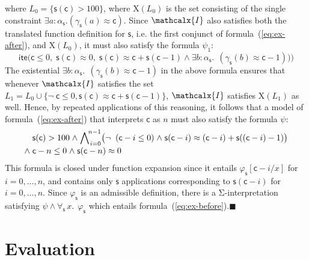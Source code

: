 \documentclass[runningheads,a4paper]{llncs}
\newcommand{\con}[1]{\mathsf{#1}}
\let\oldcup=\cup
\def\cup{\mathrel{\oldcup}}
\let\oldSigma=\Sigma
\def\Sigma{\mathrm{\oldSigma}}
\let\oldneg=\neg
\def\neg{\oldneg\;}
\let\oldwedge=\wedge
\def\wedge{\mathrel{\oldwedge}}
\newcommand{\teq}{\approx}
\newcommand{\I}{\mathcalx{I}}
\newcommand{\lite}{\con{ite}}
\newcommand\concret{\gamma} %
\newcommand{\forallf}[1]{\forall_{\!#1\:}}
\newcommand{\farg}[1]{\concret_{#1}}
\newcommand{\fargtype}[1]{\alpha_{#1}}
\newcommand{\vthinspace}{\kern+0.083333em}
\newcommand{\absconstraints}{\mathrm{X}}
\newcommand\xend{{\hfill$\scriptstyle\blacksquare$}}
\begin{document}
\begin{example}
where $L_0 = \{ \con{s}( \con{c} ) > 100 \}$, 
where $\absconstraints( L_0 )$ is the set consisting of the single constraint $\exists a : {\fargtype{\con{s}}}. (\farg{\con{s}}( a ) \teq \con{c})$.
Since $\I$ also satisfies both the translated function definition for $\con{s}$, i.e. the first conjunct of formula~(\ref{eq:ex-after}),
and $\absconstraints( L_0 )$, it must also satisfy the formula $\psi_1$:
\[
\lite\bigl( \con{c} \leq 0,\; 
            \con{s}(\con{c}) \teq 0,\;
            \con{s}(\con{c}) \teq \con{c} + \con{s}( \con{c}-1 )
            \wedge \exists b : {\fargtype{\con{s}}}.\;\, (\farg{\con{s}}( b ) \teq \con{c}-1) \bigr) \bigr)
\]
The existential $\exists b : {\fargtype{\con{s}}}.\;\, (\farg{\con{s}}( b ) \teq \con{c}-1)$ in the above formula
ensures that whenever $\I$ satisfies the set $L_1 = L_0 \cup \{ \neg \con{c} \leq 0, \con{s}(\con{c}) \teq \con{c} + \con{s}( \con{c}-1 ) \}$,
$\I$ satisfies $\absconstraints( L_1 )$ as well.
Hence, by repeated applications of this reasoning, it follows that
a model of formula~(\ref{eq:ex-after}) that interprets $\con{c}$ as $n$ must also satisfy the formula $\psi$:
%
\begin{equation} \label{eq:fun-closure}
\begin{split}
& \con{s}( \con{c} ) > 100 \wedge %
  \bigwedge\nolimits_{\vthinspace i=0}^{\!n-1} \bigl( \neg (\con{c}-i \leq 0) \wedge \con{s}( \con{c}-i ) \teq (\con{c}-i) + \con{s}( (\con{c}-i)-1 ) \bigr) \\[-\jot]
{\wedge}\; & \con{c}-n \leq 0 \wedge \con{s}( \con{c}-n ) \teq 0
\end{split}
\end{equation}
%
This formula is closed under function expansion
since it entails $\varphi_\con{s}[\con{c}-i/x]$ for $i = 0, \ldots, n$,
and contains only $\con{s}$ applications corresponding to $\con{s}( \con{c}-i )$ for $i = 0, \ldots, n$.
Since $\varphi_\con{s}$ is an admissible definition,
there is a $\Sigma$-interpretation satisfying $\psi \wedge \forallf{\con{s}} x.\;\, \varphi_\con{s}$
which entails formula~(\ref{eq:ex-before}).\xend
\end{example}

\section{Evaluation}
\label{sec:evaluation}
\end{document}
